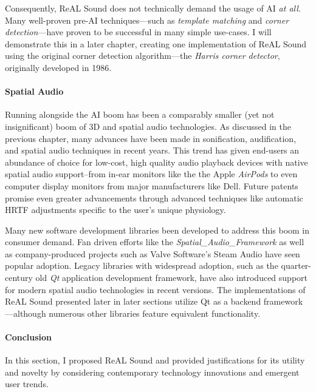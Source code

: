 \documentclass{report}
\newcommand{\rs}{ReAL Sound\xspace}
\begin{document}
Consequently, \rs does not technically demand the usage of AI \emph{at all.} Many well-proven pre-AI techniques---such as \emph{template matching}\cite{Brunelli2009-gh} and \emph{corner detection}\cite{Hildreth1980}---have proven to be successful in many simple use-cases. I will demonstrate this in a later chapter, creating one  implementation of \rs using the original corner detection algorithm---the \emph{Harris corner detector}\cite{Harris}, originally developed in 1986. 

\paragraph{Spatial Audio}
Running alongside the AI boom has been a comparably smaller (yet not insignificant) boom of 3D and spatial audio technologies. As discussed in the previous chapter, many advances have been made in sonification, audification, and spatial audio techniques in recent years. This trend has given end-users an abundance of choice for low-cost, high quality audio playback devices with native spatial audio support--from in-ear monitors like the the Apple \emph{AirPods}\cite{ApplePods} to even computer display monitors from major manufacturers like Dell\cite{Campbell_2025}. Future patents promise even greater advancements through advanced techniques like automatic HRTF adjustments specific to the user's unique physiology\cite{Antti2024}.


Many new software development libraries been developed to address this boom in consumer demand. Fan driven efforts like the \emph{Spatial\_Audio\_Framework}\cite{McCormack2024} as well as company-produced projects such as Valve Software's Steam Audio\cite{Valve} have seen popular adoption. Legacy libraries with widespread adoption, such as the quarter-century old \emph{Qt} application development framework\cite{QTProgramming}, have also introduced support for modern spatial audio technologies in recent versions\cite{QTSpatial}. The implementations of \rs presented later in later sections utilize Qt as a backend framework---although numerous other libraries feature equivalent functionality. 

\paragraph{Conclusion}
In this section, I proposed \rs and provided justifications for its utility and novelty by considering contemporary technology innovations and emergent user trends. 
\end{document}
